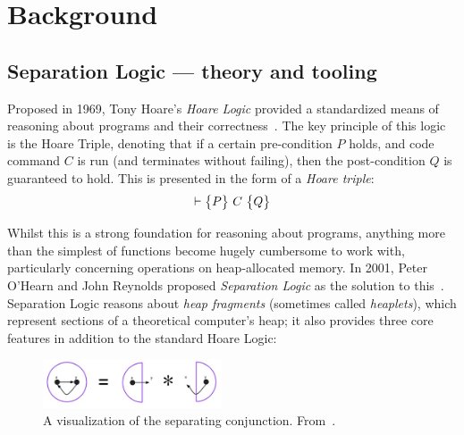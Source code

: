 
\chapter{Background}\label{sec:background}

\section{Separation Logic --- theory and tooling}\label{sec:background:sl-and-tools}

Proposed in 1969, Tony Hoare's \textit{Hoare Logic} provided a standardized
means of reasoning about programs and their correctness~\cite{hoare}. The key
principle of this logic is the Hoare Triple, denoting that if a certain
pre-condition $P$ holds, and code command $C$ is run (and terminates without
failing), then the post-condition $Q$ is guaranteed to hold. This is presented
in the form of a \textit{Hoare triple}:
\[
  \triple{P}{C}{Q}
\]

Whilst this is a strong foundation for reasoning about programs, anything more
than the simplest of functions become hugely cumbersome to work with,
particularly concerning operations on heap-allocated memory. In 2001, Peter
O'Hearn and John Reynolds proposed \textit{Separation Logic} as the solution to
this~\cite{separation-logic}. Separation Logic reasons about
\textit{heap fragments} (sometimes called \textit{heaplets}), which represent
sections of a theoretical computer's heap; it also provides three core features
in addition to the standard Hoare Logic:

\begin{figure}[!b]
  \centering
  \includegraphics[width=200px]{img/separating-conjunction.jpg}
  \caption{
    A visualization of the separating conjunction.
    From~\cite{infer-sl}.
  }\label{fig:separating-conjunction}
\end{figure}


